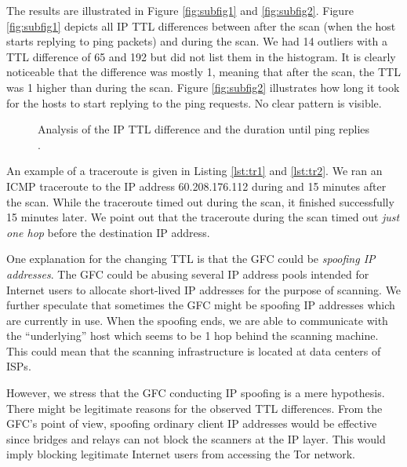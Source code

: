 \documentclass[runningheads,a4paper]{llncs}
\begin{document}
The results are illustrated in Figure \ref{fig:subfig1} and \ref{fig:subfig2}. Figure
\ref{fig:subfig1} depicts all IP TTL differences between after the scan (when the host starts
replying to ping packets) and during the scan. We had 14 outliers with a TTL difference of 65 and
192 but did not list them in the histogram. It is clearly noticeable that the difference was mostly
1, meaning that after the scan, the TTL was 1 higher than during the scan. Figure \ref{fig:subfig2}
illustrates how long it took for the hosts to start replying to the ping requests. No clear pattern
is visible.

\begin{figure}
\centering
{}
\label{fig:subfigureExample}
\caption{Analysis of the IP TTL difference  and the duration until ping replies
.}
\end{figure}

An example of a traceroute is given in Listing \ref{lst:tr1} and \ref{lst:tr2}. We ran an ICMP
traceroute to the IP address 60.208.176.112 during and 15 minutes after the scan. While the
traceroute timed out during the scan, it finished successfully 15 minutes later. We point out that
the traceroute during the scan timed out \emph{just one hop} before the destination IP address.

One explanation for the changing TTL is that the GFC could be \emph{spoofing IP addresses}. The GFC
could be abusing several IP address pools intended for Internet users to allocate short-lived IP
addresses for the purpose of scanning. We further speculate that sometimes the GFC might be
spoofing IP addresses which are currently in use. When the spoofing ends, we are able to communicate
with the ``underlying'' host which seems to be 1 hop behind the scanning machine. This could mean
that the scanning infrastructure is located at data centers of ISPs.

However, we stress that the GFC conducting IP spoofing is a mere hypothesis. There might be
legitimate reasons for the observed TTL differences. From the GFC's point of view, spoofing ordinary
client IP addresses would be effective since bridges and relays can not block the scanners at
the IP layer. This would imply blocking legitimate Internet users from accessing the Tor network.
\end{document}
